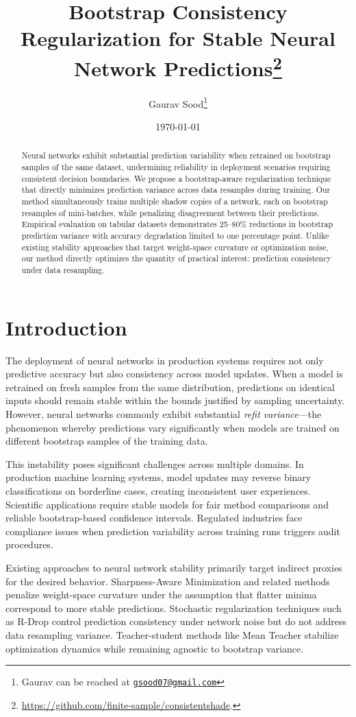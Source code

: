 \documentclass[12pt, letterpaper]{article}
\title{Bootstrap Consistency Regularization for Stable Neural Network Predictions\thanks{\href{https://github.com/finite-sample/consistentshade}{https://github.com/finite-sample/consistentshade}.}}
\author{Gaurav Sood\thanks{Gaurav can be reached at \href{mailto:gsood07@gmail.com}{\footnotesize{\texttt{gsood07@gmail.com}}}}\vspace{.5cm}}
\date{\today}
\begin{document}
\maketitle

\begin{abstract}
Neural networks exhibit substantial prediction variability when retrained on bootstrap samples of the same dataset, undermining reliability in deployment scenarios requiring consistent decision boundaries. We propose a bootstrap-aware regularization technique that directly minimizes prediction variance across data resamples during training. Our method simultaneously trains multiple shadow copies of a network, each on bootstrap resamples of mini-batches, while penalizing disagreement between their predictions. Empirical evaluation on tabular datasets demonstrates 25--80\% reductions in bootstrap prediction variance with accuracy degradation limited to one percentage point. Unlike existing stability approaches that target weight-space curvature or optimization noise, our method directly optimizes the quantity of practical interest: prediction consistency under data resampling.
\end{abstract}

\section{Introduction}

The deployment of neural networks in production systems requires not only predictive accuracy but also consistency across model updates. When a model is retrained on fresh samples from the same distribution, predictions on identical inputs should remain stable within the bounds justified by sampling uncertainty. However, neural networks commonly exhibit substantial \emph{refit variance}---the phenomenon whereby predictions vary significantly when models are trained on different bootstrap samples of the training data.

This instability poses significant challenges across multiple domains. In production machine learning systems, model updates may reverse binary classifications on borderline cases, creating inconsistent user experiences. Scientific applications require stable models for fair method comparisons and reliable bootstrap-based confidence intervals. Regulated industries face compliance issues when prediction variability across training runs triggers audit procedures.

Existing approaches to neural network stability primarily target indirect proxies for the desired behavior. Sharpness-Aware Minimization \cite{foret2020sharpness} and related methods penalize weight-space curvature under the assumption that flatter minima correspond to more stable predictions. Stochastic regularization techniques such as R-Drop \cite{liang2021rdrop} control prediction consistency under network noise but do not address data resampling variance. Teacher-student methods like Mean Teacher \cite{tarvainen2017mean} stabilize optimization dynamics while remaining agnostic to bootstrap variance.
\end{document}
